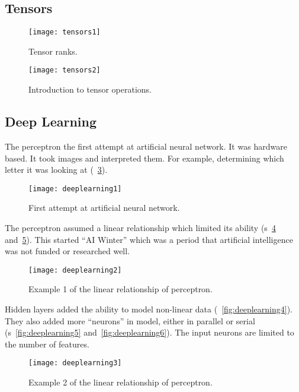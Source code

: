 	\subsection{Tensors}

 	\begin{figure}[tbh]
		\centering
		\texttt{[image: tensors1]}
		\caption[Tensor ranks]{Tensor ranks.}
		\label{fig:tensors1}
	\end{figure}
 	\begin{figure}[tbh]
		\centering
		\texttt{[image: tensors2]}
		\caption[Introduction to tensor operations]{Introduction to tensor operations.}
		\label{fig:tensors2}
	\end{figure}

	\subsection{Deep Learning}

The perceptron the first attempt at artificial neural network.  It was hardware based.  It took images and interpreted them.  For example, determining which letter it was looking at (\figurename~\ref{fig:deeplearning1}).
 	\begin{figure}[htb]
		\centering
		\texttt{[image: deeplearning1]}
		\caption[First attempt at artificial neural network]{First attempt at artificial neural network.}
		\label{fig:deeplearning1}
	\end{figure}

The perceptron assumed a linear relationship which limited its ability (\figurename{}s~\ref{fig:deeplearning2} and~\ref{fig:deeplearning3}).  This started ``AI Winter'' which was a period that artificial intelligence was not funded or researched well.

 	\begin{figure}[tbh]
		\centering
		\texttt{[image: deeplearning2]}
		\caption[Example 1 of the linear relationship of perceptron]{Example 1 of the linear relationship of perceptron.}
		\label{fig:deeplearning2}
	\end{figure}

Hidden layers added the ability to model non-linear data (\figurename~\ref{fig:deeplearning4}).  They also added more ``neurons'' in model, either in parallel or serial (\figurename{}s~\ref{fig:deeplearning5} and~\ref{fig:deeplearning6}).  The input neurons are limited to the number of features.

 	\begin{figure}[htb]
		\centering
		\texttt{[image: deeplearning3]}
		\caption[Example 2 of the linear relationship of perceptron]{Example 2 of the linear relationship of perceptron.}
		\label{fig:deeplearning3}
	\end{figure}

